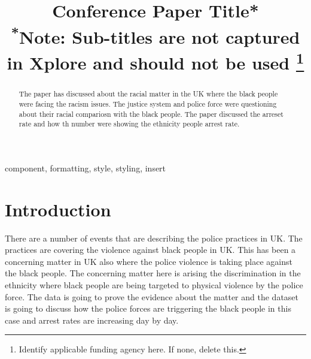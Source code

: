 \documentclass[conference]{IEEEtran}
\begin{document}
\title{Conference Paper Title*\\
{\footnotesize \textsuperscript{*}Note: Sub-titles are not captured in Xplore and
should not be used}
\thanks{Identify applicable funding agency here. If none, delete this.}
}


\maketitle

\begin{abstract}
The paper has discussed about the racial matter in the UK where the black people were facing the racism issues. The justice system and police force were questioning about their racial compariosn with the black people. The paper discussed the arreset rate and how th number were showing the ethnicity people arrest rate.
\end{abstract}

\begin{IEEEkeywords}
component, formatting, style, styling, insert
\end{IEEEkeywords}

\section{Introduction}
There are a number of events that are describing the police practices in UK. The practices are covering the violence against black people in UK. This has been a concerning matter in UK also where the police violence is taking place against the black people. The concerning matter here is arising the discrimination in the ethnicity where black people are being targeted to physical violence by the police force. The data is going to prove the evidence about the matter and the dataset is going to discuss how the police forces are triggering the black people in this case and arrest rates are increasing day by day.
\end{document}
